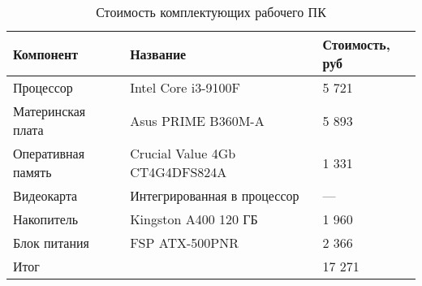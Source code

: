 \begin{table}[t]
    \centering
    \caption{Стоимость комплектующих рабочего ПК}
    \label{tab:pc_price}
    \begin{tabu}to \linewidth{XX[2,c,m]X[r,m]}
        \toprule
        Компонент & Название & Стоимость, руб \\
        \midrule
        Процессор          & Intel Core i3-9100F            & 5 721 \\
        Материнская плата  & Asus PRIME B360M-A             & 5 893 \\
        Оперативная память & Crucial Value 4Gb CT4G4DFS824A & 1 331 \\
        Видеокарта         & Интегрированная в процессор    & —     \\
        Накопитель         & Kingston A400 120 ГБ           & 1 960 \\
        Блок питания       & FSP ATX-500PNR                 & 2 366 \\
        \midrule
        Итог & & 17 271 \\
        \bottomrule
    \end{tabu}
\end{table}

